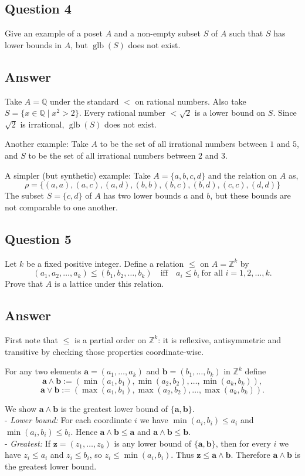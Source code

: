 \documentclass{article}
\begin{document}
\subsection*{Question 4}
Give an example of a poset $A$ and a non-empty subset $S$ of $A$ such that $S$ has lower bounds in $A$, but $\operatorname{glb}(S)$ does not exist.  

\subsection*{Answer}
Take $A = \mathbb{Q}$ under the standard $<$ on rational numbers. Also take $S = \{x \in \mathbb{Q} \mid x^2 > 2\}$. Every rational number $< \sqrt{2}$ is a lower bound on $S$. Since $\sqrt{2}$ is irrational, $\operatorname{glb}(S)$ does not exist.  

Another example: Take $A$ to be the set of all irrational numbers between $1$ and $5$, and $S$ to be the set of all irrational numbers between $2$ and $3$.  

A simpler (but synthetic) example: Take $A = \{a,b,c,d\}$ and the relation on $A$ as,  
\[
\rho = \{(a,a),(a,c),(a,d),(b,b),(b,c),(b,d),(c,c),(d,d)\}
\]  
The subset $S = \{c,d\}$ of $A$ has two lower bounds $a$ and $b$, but these bounds are not comparable to one another.

\subsection*{Question 5}
Let \(k\) be a fixed positive integer. Define a relation \(\le\) on \(A=\mathbb{Z}^k\) by
\[
(a_1,a_2,\dots,a_k)\le (b_1,b_2,\dots,b_k)\quad\text{iff}\quad a_i\le b_i\ \text{for all }i=1,2,\dots,k.
\]
Prove that \(A\) is a lattice under this relation.

\subsection*{Answer}
First note that \(\le\) is a partial order on \(\mathbb{Z}^k\): it is reflexive, antisymmetric and transitive by checking those properties coordinate-wise.

For any two elements \(\mathbf{a}=(a_1,\dots,a_k)\) and \(\mathbf{b}=(b_1,\dots,b_k)\) in \(\mathbb{Z}^k\) define
\[
\mathbf{a}\wedge\mathbf{b}:=(\min(a_1,b_1),\min(a_2,b_2),\dots,\min(a_k,b_k)),
\]
\[
\mathbf{a}\vee\mathbf{b}:=(\max(a_1,b_1),\max(a_2,b_2),\dots,\max(a_k,b_k)).
\]

We show \(\mathbf{a}\wedge\mathbf{b}\) is the greatest lower bound of \(\{\mathbf{a},\mathbf{b}\}\).  \\
- \emph{Lower bound:} For each coordinate \(i\) we have \(\min(a_i,b_i)\le a_i\) and \(\min(a_i,b_i)\le b_i\). Hence \(\mathbf{a}\wedge\mathbf{b}\le\mathbf{a}\) and \(\mathbf{a}\wedge\mathbf{b}\le\mathbf{b}\).  \\
- \emph{Greatest:} If \(\mathbf{z}=(z_1,\dots,z_k)\) is any lower bound of \(\{\mathbf{a},\mathbf{b}\}\), then for every \(i\) we have \(z_i\le a_i\) and \(z_i\le b_i\), so \(z_i\le\min(a_i,b_i)\). Thus \(\mathbf{z}\le\mathbf{a}\wedge\mathbf{b}\). Therefore \(\mathbf{a}\wedge\mathbf{b}\) is the greatest lower bound.
\\
\end{document}

